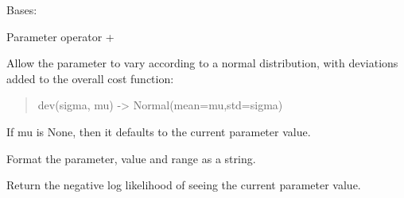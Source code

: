 \documentclass[letterpaper,10pt,english]{sphinxmanual}
\begin{document}
\begin{fulllineitems}
\label{api/mystic.parameter:refl1d.mystic.parameter.OperatorAdd}
Bases: {\hyperref[api/mystic.parameter:refl1d.mystic.parameter.BaseParameter]{}}

Parameter operator +

\begin{fulllineitems}
\label{api/mystic.parameter:refl1d.mystic.parameter.OperatorAdd.dev}
Allow the parameter to vary according to a normal distribution, with
deviations added to the overall cost function:
\begin{quote}

dev(sigma, mu) -\textgreater{} Normal(mean=mu,std=sigma)
\end{quote}

If mu is None, then it defaults to the current parameter value.

\end{fulllineitems}


\begin{fulllineitems}
\label{api/mystic.parameter:refl1d.mystic.parameter.OperatorAdd.dvalue}
\end{fulllineitems}


\begin{fulllineitems}
\label{api/mystic.parameter:refl1d.mystic.parameter.OperatorAdd.format}
Format the parameter, value and range as a string.

\end{fulllineitems}


\begin{fulllineitems}
\label{api/mystic.parameter:refl1d.mystic.parameter.OperatorAdd.nllf}
Return the negative log likelihood of seeing the current parameter value.

\end{fulllineitems}


\end{fulllineitems}
\end{document}
